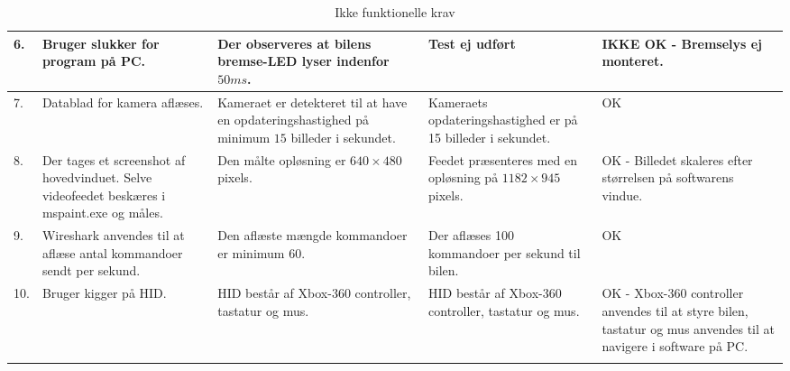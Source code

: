 \begin{longtable}{| l | L{4cm} | Z | Z | L{3 cm} |}
    6. 	& Bruger slukker for program på PC.
    	& Der observeres at bilens bremse-LED lyser indenfor $50 ms$.
    	& Test ej udført
    	& IKKE OK - Bremselys ej monteret.\\ \hline
    
	7. 	& Datablad for kamera aflæses.
		& Kameraet er detekteret til at have en opdateringshastighed på minimum $15$ billeder i sekundet.
		& Kameraets opdateringshastighed er på 15 billeder i sekundet.
		& OK\\ \hline
       
    8. 	& Der tages et screenshot af hovedvinduet. Selve videofeedet beskæres i mspaint.exe og måles.
    	& Den målte opløsning er $640 \times 480$ pixels.
    	& Feedet præsenteres med en opløsning på $1182 \times 945$ pixels.
    	& OK - Billedet skaleres efter størrelsen på softwarens vindue.\\ \hline
    
    9. 	& Wireshark anvendes til at aflæse antal kommandoer sendt per sekund.
    	& Den aflæste mængde kommandoer er minimum $60$.
    	& Der aflæses 100 kommandoer per sekund til bilen.
    	& OK\\ \hline
    	
    10.	& Bruger kigger på HID.
    	& HID består af Xbox-360 controller, tastatur og mus.
    	& HID består af Xbox-360 controller, tastatur og mus.
    	& OK -  Xbox-360 controller anvendes til at styre bilen, tastatur og mus anvendes til at navigere i software på PC.\\ \hline 
    
\caption{Ikke funktionelle krav}
\label{tbl:ikkefunk}
\end{longtable}
